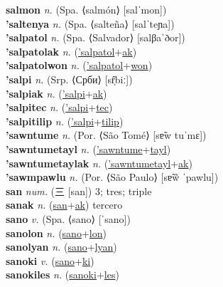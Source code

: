 \textbf{salmon} \textit{n.} (Spa. ⟨salmón⟩ [salˈmon])
 \label{salmon} \\
\textbf{'saltenya} \textit{n.} (Spa. ⟨salteña⟩ [salˈteɲa])
 \label{'saltenya} \\
\textbf{'salpatol} \textit{n.} (Spa. ⟨Salvador⟩ [salβaˈðor])
 \label{'salpatol} \\
\textbf{'salpatolak} \textit{n.} (\hyperref['salpatol]{'salpatol}+\hyperref[ak]{ak})
 \label{'salpatolak} \\
\textbf{'salpatolwon} \textit{n.} (\hyperref['salpatol]{'salpatol}+\hyperref[won]{won})
 \label{'salpatolwon} \\
\textbf{'salpi} \textit{n.} (Srp. ⟨Срби⟩ [sr̩̂biː])
 \label{'salpi} \\
\textbf{'salpiak} \textit{n.} (\hyperref['salpi]{'salpi}+\hyperref[ak]{ak})
 \label{'salpiak} \\
\textbf{'salpitec} \textit{n.} (\hyperref['salpi]{'salpi}+\hyperref[tec]{tec})
 \label{'salpitec} \\
\textbf{'salpitilip} \textit{n.} (\hyperref['salpi]{'salpi}+\hyperref[tilip]{tilip})
 \label{'salpitilip} \\
\textbf{'sawntume} \textit{n.} (Por. ⟨São Tomé⟩ [sɐ̃w tuˈmɛ])
 \label{'sawntume} \\
\textbf{'sawntumetayl} \textit{n.} (\hyperref['sawntume]{'sawntume}+\hyperref[tayl]{tayl})
 \label{'sawntumetayl} \\
\textbf{'sawntumetaylak} \textit{n.} (\hyperref['sawntumetayl]{'sawntumetayl}+\hyperref[ak]{ak})
 \label{'sawntumetaylak} \\
\textbf{'sawmpawlu} \textit{n.} (Por. ⟨São Paulo⟩ [sɐ̃w̃ ˈpawlu])
 \label{'sawmpawlu} \\
\textbf{san} \textit{num.} ({\chinese{}三} [san])
3; tres; triple \label{san} \\
\textbf{sanak} \textit{n.} (\hyperref[san]{san}+\hyperref[ak]{ak})
tercero \label{sanak} \\
\textbf{sano} \textit{v.} (Spa. ⟨sano⟩ [ˈsano])
 \label{sano} \\
\textbf{sanolon} \textit{n.} (\hyperref[sano]{sano}+\hyperref[lon]{lon})
 \label{sanolon} \\
\textbf{sanolyan} \textit{n.} (\hyperref[sano]{sano}+\hyperref[lyan]{lyan})
 \label{sanolyan} \\
\textbf{sanoki} \textit{v.} (\hyperref[sano]{sano}+\hyperref[ki]{ki})
 \label{sanoki} \\
\textbf{sanokiles} \textit{n.} (\hyperref[sanoki]{sanoki}+\hyperref[les]{les})
